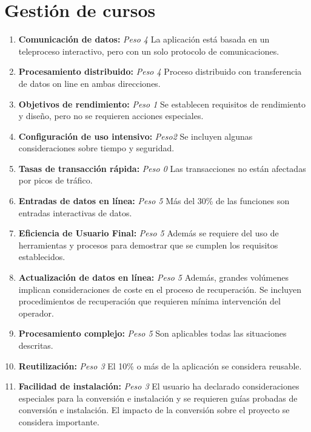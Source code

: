 \documentclass[11pt,a4paper,spanish,twoside]{book}
\begin{document}
\section{Gestión de cursos}
\begin{enumerate}[{\bf 1.}]

\item {\bf Comunicación de datos:} \emph{Peso 4} La aplicación está basada en
  un teleproceso interactivo, pero con un solo protocolo de comunicaciones.

\item {\bf Procesamiento distribuido:} \emph{Peso 4} Proceso distribuido
  con transferencia de datos on line en ambas direcciones. 

\item {\bf Objetivos de rendimiento:} \emph{Peso 1} Se establecen requisitos
  de rendimiento y diseño, pero no se requieren acciones especiales.

\item {\bf Configuración de uso intensivo:} \emph{Peso2} Se incluyen algunas
  consideraciones sobre tiempo y seguridad. 

\item {\bf Tasas de transacción rápida:} \emph{Peso 0} Las transacciones no
  están afectadas por picos de tráfico. 

\item {\bf Entradas de datos en línea:} \emph{Peso 5} Más del 30\% de las
  funciones son entradas interactivas de datos. 

\item {\bf Eficiencia de Usuario Final:} \emph{Peso 5} Además se requiere del
  uso de herramientas y procesos para demostrar que se cumplen los requisitos
  establecidos.

\item {\bf Actualización de datos en línea:} \emph{Peso 5} Además, grandes
  volúmenes implican consideraciones de coste en el proceso de
  recuperación. Se incluyen procedimientos de recuperación que requieren
  mínima intervención del operador. 

\item {\bf Procesamiento complejo:} \emph{Peso 5} Son aplicables todas las
  situaciones descritas.
 
\item {\bf Reutilización:} \emph{Peso 3} El 10\% o más de la aplicación se
  considera reusable. 

\item {\bf Facilidad de instalación:} \emph{Peso 3} El usuario ha declarado
  consideraciones especiales para la conversión e instalación y se requieren
  guías probadas de conversión e instalación. El impacto de la conversión
  sobre el proyecto se considera importante. 


\end{enumerate}
\end{document}
